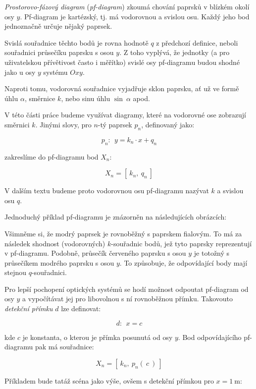 \emph{Prostorovo-fázový diagram} (\emph{pf-diagram}) zkoumá chování paprsků v blízkém okolí osy $y$.
Pf-diagram je kartézský, tj. má vodorovnou a svislou osu. Každý jeho bod jednoznačně určuje nějaký paprsek.

Svislá souřadnice těchto bodů je rovna hodnotě $q$ z předchozí definice, neboli souřadnici průsečíku paprsku s osou $y$. Z toho vyplývá, že jednotky (a pro uživatelskou přívětivost často i měřítko) svislé osy pf-diagramu budou shodné jako u osy $y$ systému $Oxy$.

Naproti tomu, vodorovná souřadnice vyjadřuje sklon paprsku, ať už ve formě úhlu $\alpha$, směrnice $k$, nebo sinu úhlu $\sin\ \alpha$ apod.

V této části práce budeme využívat diagramy, které na vodorovné ose zobrazují směrnici $k$. Jinými slovy, pro $n$-tý paprsek $p_n$, definovaný jako:

\[ p_n:\ \ y = k_n \cdot x + q_n \]

zakreslíme do pf-diagramu bod $X_n$: 

\[ X_n = [\ k_n,\ q_n\ ] \]

V dalším textu budeme proto vodorovnou osu pf-diagramu nazývat $k$ a svislou osu $q$.

Jednoduchý příklad pf-diagramu je znázorněn na následujících obrázcích:


Všimněme si, že modrý paprsek je rovnoběžný s paprskem fialovým. To má za následek shodnost (vodorovných) $k$-souřadnic bodů, jež tyto paprsky reprezentují v pf-diagramu. Podobně, průsečík červeného paprsku s osou $y$ je totožný s průsečíkem modrého paprsku s osou $y$. To způsobuje, že odpovídající body mají stejnou $q$-souřadnici.

Pro lepší pochopení optických systémů se hodí možnost odpoutat pf-diagram od osy $y$ a vypočítávat jej pro libovolnou s ní rovnoběžnou přímku. Takovouto \emph{detekční přímku} $d$ lze definovat:

\[ d:\ \ x = c \]

kde $c$ je konstanta, o kterou je přímka posunutá od osy $y$. Bod odpovídajícího pf-diagramu pak má souřadnice:

\[ X_n = [\ k_n,\ p_n(\ c\ )\ ] \]

Příkladem bude tatáž scéna jako výše, ovšem s detekční přímkou pro $x = 1\ \mathrm{m}$:

